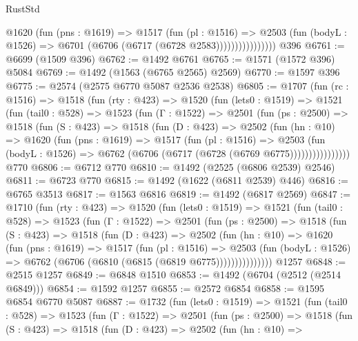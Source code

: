 \begin{lexlean}{RustStd}
\begin{coremodule}
{\begin{coremodule}
{{{{{{{{{{{{{                      @1620
                        (fun (pns : @1619) =>
                        @1517
                          (fun (pl : @1516) =>
                          @2503
                            (fun (bodyL : @1526) => @6701 (@6706 (@6717 (@6728 @2583))))))))))))))))
    @396
@6761 := @6699 (@1509 @396)
@6762 := @1492 @6761
@6765 := @1571 (@1572 @396) @5084
@6769 := @1492 (@1563 (@6765 @2565) @2569)
@6770 := @1597 @396
@6775 := @2574 (@2575 @6770 @5087 @2536 @2538)
@6805 := @1707
    (fun (rc : @1516) =>
    @1518
      (fun (rty : @423) =>
      @1520
        (fun (lets0 : @1519) =>
        @1521
          (fun (tail0 : @528) =>
          @1523
            (fun (Γ : @1522) =>
            @2501
              (fun (ps : @2500) =>
              @1518
                (fun (S : @423) =>
                @1518
                  (fun (D : @423) =>
                  @2502
                    (fun (hn : @10) =>
                    @1620
                      (fun (pns : @1619) =>
                      @1517
                        (fun (pl : @1516) =>
                        @2503
                          (fun (bodyL : @1526) =>
                          @6762 (@6706 (@6717 (@6728 (@6769 @6775))))))))))))))))
    @770
@6806 := @6712 @770
@6810 := @1492 (@2525 (@6806 @2539) @2546)
@6811 := @6723 @770
@6815 := @1492 (@1622 (@6811 @2539) @446)
@6816 := @6765 @3513
@6817 := @1563 @6816
@6819 := @1492 (@6817 @2569)
@6847 := @1710
    (fun (rty : @423) =>
    @1520
      (fun (lets0 : @1519) =>
      @1521
        (fun (tail0 : @528) =>
        @1523
          (fun (Γ : @1522) =>
          @2501
            (fun (ps : @2500) =>
            @1518
              (fun (S : @423) =>
              @1518
                (fun (D : @423) =>
                @2502
                  (fun (hn : @10) =>
                  @1620
                    (fun (pns : @1619) =>
                    @1517
                      (fun (pl : @1516) =>
                      @2503
                        (fun (bodyL : @1526) =>
                        @6762 (@6706 (@6810 (@6815 (@6819 @6775)))))))))))))))
    @1257
@6848 := @2515 @1257
@6849 := @6848 @1510
@6853 := @1492 (@6704 (@2512 (@2514 @6849)))
@6854 := @1592 @1257
@6855 := @2572 @6854
@6858 := @1595 @6854 @6770 @5087
@6887 := @1732
    (fun (lets0 : @1519) =>
    @1521
      (fun (tail0 : @528) =>
      @1523
        (fun (Γ : @1522) =>
        @2501
          (fun (ps : @2500) =>
          @1518
            (fun (S : @423) =>
            @1518
              (fun (D : @423) =>
              @2502
                (fun (hn : @10) =>
}}}}}}}}}}}}}
\end{coremodule}}
\end{coremodule}
\end{lexlean}
